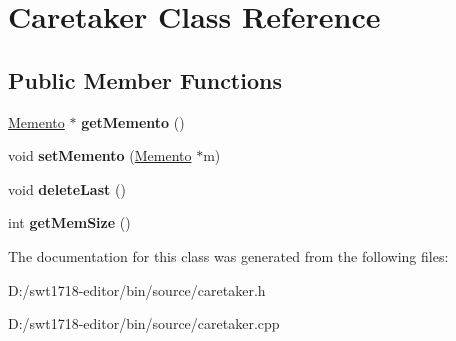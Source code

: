 \hypertarget{class_caretaker}{}\section{Caretaker Class Reference}
\label{class_caretaker}
\subsection*{Public Member Functions}
\begin{DoxyCompactItemize}
\item 
\mbox{\label{class_caretaker_add41f564551d753809fbe168cd38008a}} 
\mbox{\hyperlink{class_memento}{Memento}} $\ast$ {\bfseries get\+Memento} ()
\item 
\mbox{\label{class_caretaker_ad4cc3a4e331e21e0333b8af8e1571782}} 
void {\bfseries set\+Memento} (\mbox{\hyperlink{class_memento}{Memento}} $\ast$m)
\item 
\mbox{\label{class_caretaker_aafcf9acc1689fc7728b2f8115a413ecc}} 
void {\bfseries delete\+Last} ()
\item 
\mbox{\label{class_caretaker_a756d877f9f4484243549f27b21dfd586}} 
int {\bfseries get\+Mem\+Size} ()
\end{DoxyCompactItemize}


The documentation for this class was generated from the following files\+:\begin{DoxyCompactItemize}
\item 
D\+:/swt1718-\/editor/bin/source/caretaker.\+h\item 
D\+:/swt1718-\/editor/bin/source/caretaker.\+cpp\end{DoxyCompactItemize}
